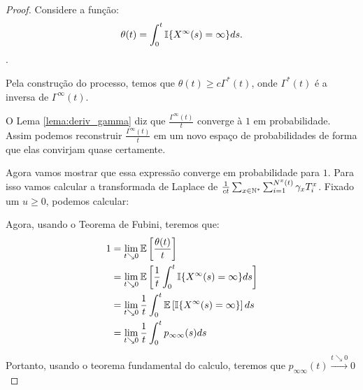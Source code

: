 \begin{proof}
  Considere a função:
  \begin{displaymath}
    \theta(t) = \int_0^t {\mathbb{I}} \{ X^\infty (s) = \infty \} ds.
  \end{displaymath}.
  
  Pela construção do processo, temos que $\theta(t) \geq c
  \Gamma^*(t)$, onde $\Gamma^*(t)$ é a inversa de $\Gamma^\infty(t)$.

  O Lema \ref{lema:deriv_gamma} diz que $\frac{\Gamma^\infty(t)}{t}$
  converge à $1$ em probabilidade. Assim podemos reconstruir
  $\frac{\Gamma^\infty(t)}{t}$ em um novo espaço de probabilidades de
  forma que elas convirjam quase certamente.

  Agora vamos mostrar que essa expressão converge em probabilidade
  para $1$. Para isso vamos calcular a transformada de Laplace de
  $\frac{1}{ct} \sum_{x \in {\mathbb{N^*}}} \sum_{i = 1}^{N^x(t)} \gamma_x
  T^x_i$. Fixado um $u \geq 0$, podemos calcular:





  Agora, usando o Teorema de Fubini, teremos que:
  \begin{align*}
    1 &= \lim_{t \searrow 0} {\mathbb{E}} \left[ \frac{\theta(t)}{t} \right] \\ 
    &= \lim_{t \searrow 0} {\mathbb{E}}\left[
      \frac{1}{t} \int_0^t {\mathbb{I}}\{ X^\infty(s) = \infty \} ds
    \right] \\
    &= \lim_{t \searrow 0} 
      \frac{1}{t} \int_0^t {\mathbb{E}}\left[ {\mathbb{I}}\{ X^\infty(s) = \infty \}\right] ds
    \\
    &= \lim_{t \searrow 0} \frac{1}{t} \int_0^t p_{\infty \infty} (s) ds
  \end{align*}

  Portanto, usando o teorema fundamental do calculo, teremos que
  $p_{\infty \infty} (t) \xrightarrow{t \searrow 0} 0$


\end{proof}

